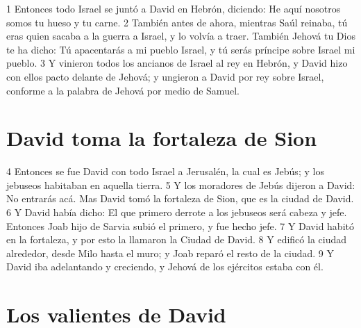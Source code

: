 1 Entonces todo Israel se juntó a David en Hebrón, diciendo: He aquí nosotros somos tu hueso y tu carne.
2 También antes de ahora, mientras Saúl reinaba, tú eras quien sacaba a la guerra a Israel, y lo volvía a traer. También Jehová tu Dios te ha dicho: Tú apacentarás a mi pueblo Israel, y tú serás príncipe sobre Israel mi pueblo.
3 Y vinieron todos los ancianos de Israel al rey en Hebrón, y David hizo con ellos pacto delante de Jehová; y ungieron a David por rey sobre Israel, conforme a la palabra de Jehová por medio de Samuel.
\section*{David toma la fortaleza de Sion}


4 Entonces se fue David con todo Israel a Jerusalén, la cual es Jebús; y los jebuseos habitaban en aquella tierra. 
5 Y los moradores de Jebús dijeron a David: No entrarás acá. Mas David tomó la fortaleza de Sion, que es la ciudad de David.
6 Y David había dicho: El que primero derrote a los jebuseos será cabeza y jefe. Entonces Joab hijo de Sarvia subió el primero, y fue hecho jefe.
7 Y David habitó en la fortaleza, y por esto la llamaron la Ciudad de David.
8 Y edificó la ciudad alrededor, desde Milo hasta el muro; y Joab reparó el resto de la ciudad.
9 Y David iba adelantando y creciendo, y Jehová de los ejércitos estaba con él.
\section*{Los valientes de David }

